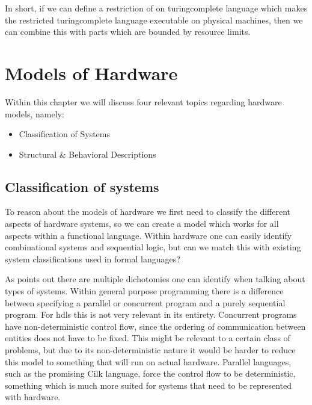 In short, if we can define a restriction of on \gls{turingcomplete} language which makes the restricted \gls{turingcomplete} language executable on physical machines, then we can combine this with parts which are bounded by resource limits.

%
%
\section{Models of Hardware} \label{ch:moh}
Within this chapter we will discuss four relevant topics regarding hardware models, namely:
\begin{itemize}
 \item Classification of Systems
 \item Structural \& Behavioral Descriptions
\end{itemize}

\subsection{Classification of systems}
To reason about the models of hardware we first need to classify the different aspects of hardware systems, so we can create a model which works for all aspects within a functional language.
Within hardware one can easily identify combinational systems and sequential logic, but can we match this with existing system classifications used in formal languages?

As \cite{harel1985development} points out there are multiple dichotomies one can identify when talking about types of systems.
Within general purpose programming there is a difference between specifying a parallel or concurrent program and a purely sequential program.
For \glspl{hdl} this is not very relevant in its entirety. 
Concurrent programs have non-deterministic control flow, since the ordering of communication between entities does not have to be fixed.
This might be relevant to a certain class of problems, but due to its non-deterministic nature it would be harder to reduce this model to something that will run on actual hardware.
Parallel languages, such as the promising Cilk\cite{blumofe1995cilk} language, force the control flow to be deterministic, something which is much more suited for systems that need to be represented with hardware.


